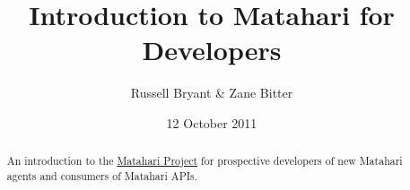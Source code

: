\documentclass{tufte-handout}
\title{Introduction to Matahari for Developers}
\author{Russell Bryant \& Zane Bitter}
\date{12 October 2011}
\begin{document}
\maketitle

\begin{abstract}
An introduction to the \href{http://matahariproject.org}{Matahari Project} for prospective developers of new Matahari agents and consumers of Matahari APIs.
\end{abstract}








\end{document}
